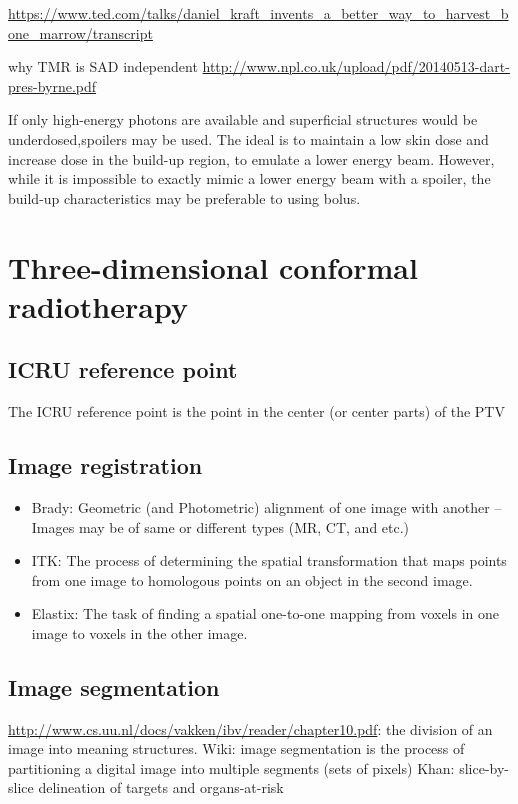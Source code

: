\documentclass[]{book}
\providecommand{\tightlist}{%
  \setlength{\itemsep}{0pt}\setlength{\parskip}{0pt}}
\theoremstyle{definition}
\theoremstyle{definition}
\theoremstyle{definition}
\theoremstyle{remark}
\begin{document}
\url{https://www.ted.com/talks/daniel_kraft_invents_a_better_way_to_harvest_bone_marrow/transcript}

why TMR is SAD independent
\url{http://www.npl.co.uk/upload/pdf/20140513-dart-pres-byrne.pdf}

If only high-energy photons are available and superficial structures
would be underdosed,spoilers may be used. The ideal is to maintain a low
skin dose and increase dose in the build-up region, to emulate a lower
energy beam. However, while it is impossible to exactly mimic a lower
energy beam with a spoiler, the build-up characteristics may be
preferable to using bolus.

\chapter{Three-dimensional conformal radiotherapy}\label{crt}

\section{ICRU reference point}\label{icru-reference-point}

The ICRU reference point is the point in the center (or center parts) of
the PTV

\section{Image registration}\label{image-registration}

\begin{itemize}
\tightlist
\item
  Brady: Geometric (and Photometric) alignment of one image with another
  -- Images may be of same or different types (MR, CT, and etc.)
\item
  ITK: The process of determining the spatial transformation that maps
  points from one image to homologous points on an object in the second
  image.
\item
  Elastix: The task of finding a spatial one-to-one mapping from voxels
  in one image to voxels in the other image.
\end{itemize}

\section{Image segmentation}\label{image-segmentation}

\url{http://www.cs.uu.nl/docs/vakken/ibv/reader/chapter10.pdf}: the
division of an image into meaning structures. Wiki: image segmentation
is the process of partitioning a digital image into multiple segments
(sets of pixels) Khan: slice-by-slice delineation of targets and
organs-at-risk
\end{document}
